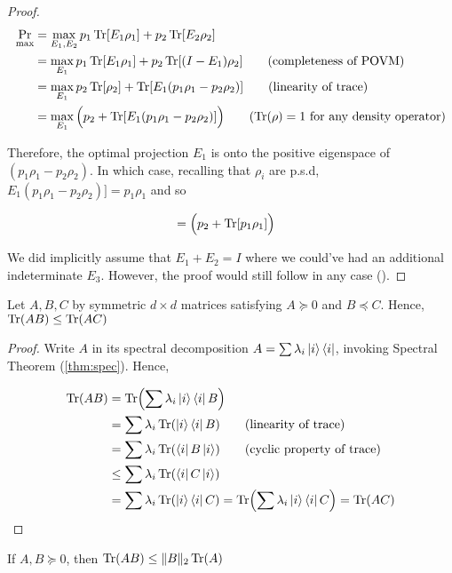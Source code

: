 \documentclass[main.tex]{subfiles}
\begin{document}
\begin{subappendices}
\begin{proof}
\begin{align*}
\Pr_{\max} &= \max_{E_1, E_2}p_1\Tr[E_1\rho_1] + p_2\Tr[E_2\rho_2] \\
&= \max_{E_1} p_1\Tr[E_1\rho_1] + p_2\Tr[(I - E_1)\rho_2] \tag{completeness of POVM} \\
&= \max_{E_1}p_2\Tr[\rho_2] + \Tr[E_1(p_1\rho_1 - p_2\rho_2)] \tag{linearity of trace} \\
&= \max_{E_1} \Big( p_2 + \Tr[E_1(p_1\rho_1 - p_2\rho_2)]\Big) \tag{$\Tr(\rho) = 1$ for any density operator}
\end{align*}

Therefore, the optimal projection $E_1$ is onto the positive eigenspace of $(p_1\rho_1 - p_2\rho_2)$. In which case, recalling that $\rho_i$ are p.s.d, $E_1(p_1\rho_1 - p_2\rho_2)] = p_1 \rho_1$ and so

\begin{align*}
&= 	\Big( p_2 + \Tr[p_1\rho_1]\Big)
\end{align*}
 
	
We did implicitly assume that $E_1 + E_2 = I$ where we could've had an additional indeterminate $E_3$. However, the proof would still follow in any case (\cite{nielsen2010quantum}).
\end{proof}


\begin{lemma}
\label{lem:psd-trace}
Let $A, B, C$ by symmetric $d \times d$ matrices satisfying $A \succeq 0$ and $B \preceq C$. Hence, $\Tr(AB) \leq \Tr(AC)$

\begin{proof}
	Write $A$ in its spectral decomposition $A = \sum \lambda_i \ket{i}\bra{i}$, invoking Spectral Theorem (\ref{thm:spec}). Hence,
	
	\begin{align*}
		\Tr(AB) &= \Tr(\sum \lambda_i \ket{i}\bra{i} B)\\
		&= \sum \lambda_i \Tr(\ket{i}\bra{i} B) \tag{linearity of trace}\\
		&= \sum \lambda_i \Tr(\bra{i} B \ket{i}) \tag{cyclic property of trace}\\
		&\leq \sum \lambda_i \Tr(\bra{i} C \ket{i})\\
		&= \sum \lambda_i \Tr(\ket{i}\bra{i} C) = \Tr(\sum \lambda_i \ket{i}\bra{i} C) = \Tr(AC)
	\end{align*}
\end{proof}
\end{lemma}

\begin{corollary}
\label{cor:psd-tr-norm-ineq}
If $A, B \succeq 0$, then $\Tr(AB) \leq \Vert B \Vert_2 \Tr(A)$


\end{corollary}
\end{subappendices}
\end{document}
